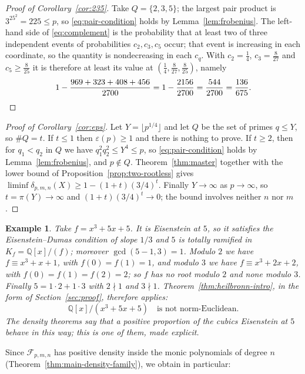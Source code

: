 \documentclass[11pt,reqno]{amsart}
\theoremstyle{plain}
\newtheorem{example}[theorem]{Example}
\theoremstyle{definition}
\theoremstyle{remark}
\newcommand{\Q}{\mathbb{Q}}
\begin{document}
\begin{proof}[Proof of Corollary~\ref{cor:235}]
Take $Q=\{2,3,5\}$; the largest pair product is $3^25^2=225\le p$, so
\eqref{eq:pair-condition} holds by Lemma~\ref{lem:frobenius}. The left-hand side of
\eqref{eq:complement} is the probability that at least two of three independent events of
probabilities $c_2,c_3,c_5$ occur; that event is increasing in each coordinate, so the quantity is
nondecreasing in each $c_q$. With $c_2=\frac14$, $c_3=\frac8{27}$ and $c_5\ge\frac8{25}$ it is
therefore at least its value at $(\frac14,\frac8{27},\frac8{25})$, namely
\[
  1-\frac{969+323+408+456}{2700}=1-\frac{2156}{2700}=\frac{544}{2700}=\frac{136}{675}. \qedhere
\]
\end{proof}

\begin{proof}[Proof of Corollary~\ref{cor:eps}]
Let $Y=\lfloor p^{1/4}\rfloor$ and let $Q$ be the set of primes $q\le Y$, so $\#Q=t$. If
$t\le1$ then $\varepsilon(p)\ge1$ and there is nothing to prove. If $t\ge2$, then for $q_1<q_2$
in $Q$ we have $q_1^2q_2^2\le Y^4\le p$, so \eqref{eq:pair-condition} holds by
Lemma~\ref{lem:frobenius}, and $p\notin Q$.
Theorem~\ref{thm:master} together with the lower bound of Proposition~\ref{prop:two-rootless}
gives $\liminf\delta_{p,m,n}(X)\ge1-(1+t)(3/4)^t$. Finally $Y\to\infty$ as $p\to\infty$, so
$t=\pi(Y)\to\infty$ and $(1+t)(3/4)^t\to0$; the bound involves neither $n$ nor $m$.
\end{proof}

\begin{example}\label{ex:cubic}
Take $f=x^{3}+5x+5$. It is Eisenstein at $5$, so it satisfies the Eisenstein--Dumas condition of
slope $1/3$ and $5$ is totally ramified in $K_f=\Q[x]/(f)$; moreover $\gcd(5-1,3)=1$. Modulo $2$
we have $f\equiv x^{3}+x+1$, with $f(0)=f(1)=1$, and modulo $3$ we have $f\equiv x^{3}+2x+2$,
with $f(0)=f(1)=f(2)=2$; so $f$ has no root modulo $2$ and none modulo $3$. Finally
$5=1\cdot2+1\cdot3$ with $2\nmid1$ and $3\nmid1$. Theorem~\ref{thm:heilbronn-intro}, in the form
of Section~\ref{sec:proof}, therefore applies:
\[
  \Q[x]/(x^{3}+5x+5)\quad\text{is not norm-Euclidean.}
\]
The density theorems say that a positive proportion of the cubics Eisenstein at $5$ behave in
this way; this is one of them, made explicit.
\end{example}

Since $\mathcal F_{p,m,n}$ has positive density inside the monic polynomials of degree $n$
(Theorem~\ref{thm:main-density-family}), we obtain in particular:
\end{document}
